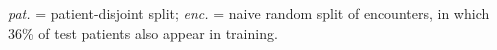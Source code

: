 {\footnotesize \emph{pat.} = patient-disjoint split; \emph{enc.} = naive random split of encounters, in which 36\% of test patients also appear in training.}
